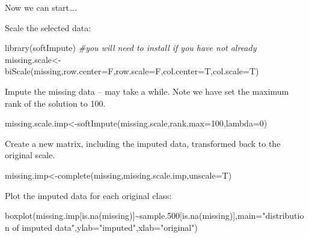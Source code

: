 \documentclass[
]{book}
\newenvironment{Shaded}{\begin{snugshade}}{\end{snugshade}}
\newcommand{\AttributeTok}[1]{\textcolor[rgb]{0.77,0.63,0.00}{#1}}
\newcommand{\CommentTok}[1]{\textcolor[rgb]{0.56,0.35,0.01}{\textit{#1}}}
\newcommand{\DecValTok}[1]{\textcolor[rgb]{0.00,0.00,0.81}{#1}}
\newcommand{\FloatTok}[1]{\textcolor[rgb]{0.00,0.00,0.81}{#1}}
\newcommand{\FunctionTok}[1]{\textcolor[rgb]{0.00,0.00,0.00}{#1}}
\newcommand{\NormalTok}[1]{#1}
\newcommand{\OtherTok}[1]{\textcolor[rgb]{0.56,0.35,0.01}{#1}}
\newcommand{\SpecialCharTok}[1]{\textcolor[rgb]{0.00,0.00,0.00}{#1}}
\newcommand{\StringTok}[1]{\textcolor[rgb]{0.31,0.60,0.02}{#1}}
\begin{document}
Now we can start\ldots.

Scale the selected data:

\begin{Shaded}
\begin{Highlighting}[]
\FunctionTok{library}\NormalTok{(softImpute) }\CommentTok{\#you will need to install if you have not already}
\NormalTok{missing.scale}\OtherTok{\textless{}{-}}\FunctionTok{biScale}\NormalTok{(missing,}\AttributeTok{row.center=}\NormalTok{F,}\AttributeTok{row.scale=}\NormalTok{F,}\AttributeTok{col.center=}\NormalTok{T,}\AttributeTok{col.scale=}\NormalTok{T)}
\end{Highlighting}
\end{Shaded}

Impute the missing data -- may take a while. Note we have set the maximum rank of the solution to 100.

\begin{Shaded}
\begin{Highlighting}[]
\NormalTok{missing.scale.imp}\OtherTok{\textless{}{-}}\FunctionTok{softImpute}\NormalTok{(missing.scale,}\AttributeTok{rank.max=}\DecValTok{100}\NormalTok{,}\AttributeTok{lambda=}\DecValTok{0}\NormalTok{)  }
\end{Highlighting}
\end{Shaded}

Create a new matrix, including the imputed data, transformed back to the original scale.

\begin{Shaded}
\begin{Highlighting}[]
\NormalTok{missing.imp}\OtherTok{\textless{}{-}}\FunctionTok{complete}\NormalTok{(missing,missing.scale.imp,}\AttributeTok{unscale=}\NormalTok{T)}
\end{Highlighting}
\end{Shaded}

Plot the imputed data for each original class:

\begin{Shaded}
\begin{Highlighting}[]
\FunctionTok{boxplot}\NormalTok{(missing.imp[}\FunctionTok{is.na}\NormalTok{(missing)]}\SpecialCharTok{\textasciitilde{}}\NormalTok{sample}\FloatTok{.500}\NormalTok{[}\FunctionTok{is.na}\NormalTok{(missing)],}\AttributeTok{main=}\StringTok{"distribution of imputed data"}\NormalTok{,}\AttributeTok{ylab=}\StringTok{"imputed"}\NormalTok{,}\AttributeTok{xlab=}\StringTok{"original"}\NormalTok{)}
\end{Highlighting}
\end{Shaded}
\end{document}
